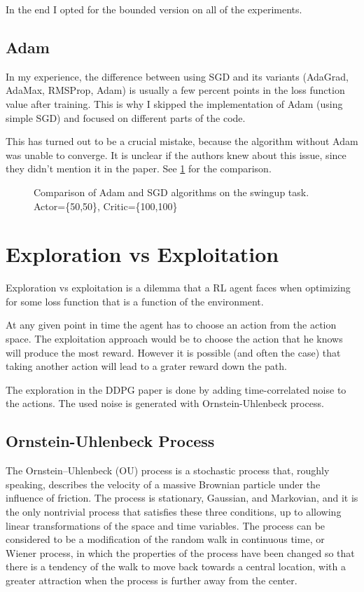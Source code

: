 In the end I opted for the bounded version on all of the experiments.

\subsection{Adam}
In my experience, the difference between using SGD and its variants (AdaGrad, AdaMax, RMSProp, Adam) is usually a few percent points in the loss function value after training. This is why I skipped the implementation of Adam (using simple SGD) and focused on different parts of the code.

This has turned out to be a crucial mistake, because the algorithm without Adam was unable to converge. It is unclear if the authors knew about this issue, since they didn't mention it in the paper. See \ref{fig:adam-sgd} for the comparison.

\begin{figure}[htbp]

\caption{Comparison of Adam and SGD algorithms on the swingup task. Actor=\{50,50\}, Critic=\{100,100\}}
\centering
\label{fig:adam-sgd}
\end{figure}

\section{Exploration vs Exploitation}

Exploration vs exploitation is a dilemma that a RL agent faces when optimizing for some loss function that is a function of the environment. 

At any given point in time the agent has to choose an action from the action space. The exploitation approach would be to choose the action that he knows will produce the most reward. However it is possible (and often the case) that taking another action will lead to a grater reward down the path.

The exploration in the DDPG paper is done by adding time-correlated noise to the actions. The used noise is generated with Ornstein-Uhlenbeck process. 

\subsection{Ornstein-Uhlenbeck Process}
The Ornstein–Uhlenbeck (OU) process is a stochastic process that, roughly speaking, describes the velocity of a massive Brownian particle under the influence of friction. The process is stationary, Gaussian, and Markovian, and it is the only nontrivial process that satisfies these three conditions, up to allowing linear transformations of the space and time variables. The process can be considered to be a modification of the random walk in continuous time, or Wiener process, in which the properties of the process have been changed so that there is a tendency of the walk to move back towards a central location, with a greater attraction when the process is further away from the center. \cite{cite:wiki-ou}

